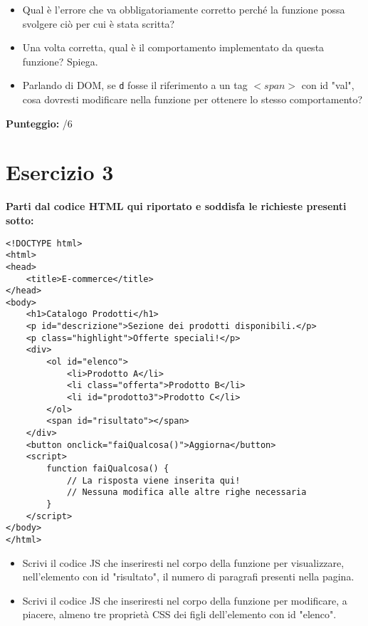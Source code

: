 \documentclass{article}
\begin{document}
\begin{itemize}
    \item Qual è l'errore che va obbligatoriamente corretto perché la funzione possa svolgere ciò per cui è stata scritta?
    \item Una volta corretta, qual è il comportamento implementato da questa funzione? Spiega.
    \item Parlando di DOM, se \texttt{d} fosse il riferimento a un tag $<span>$ con id "val", cosa dovresti modificare nella funzione per ottenere lo stesso comportamento?
\end{itemize}

\begin{flushright}\textbf{Punteggio:} \underline{\hspace{1cm}}/6\end{flushright}

\section*{Esercizio 3}

\textbf{Parti dal codice HTML qui riportato e soddisfa le richieste presenti sotto:}

\begin{lstlisting}
<!DOCTYPE html>
<html>
<head>
    <title>E-commerce</title>
</head>
<body>
    <h1>Catalogo Prodotti</h1>
    <p id="descrizione">Sezione dei prodotti disponibili.</p>
    <p class="highlight">Offerte speciali!</p>
    <div>
        <ol id="elenco">
            <li>Prodotto A</li>
            <li class="offerta">Prodotto B</li>
            <li id="prodotto3">Prodotto C</li>
        </ol>
        <span id="risultato"></span>
    </div>
    <button onclick="faiQualcosa()">Aggiorna</button>
    <script>
        function faiQualcosa() {
            // La risposta viene inserita qui! 
            // Nessuna modifica alle altre righe necessaria
        }
    </script>
</body>
</html>
\end{lstlisting}

\begin{itemize}
    \item Scrivi il codice JS che inseriresti nel corpo della funzione per visualizzare, nell'elemento con id "risultato", il numero di paragrafi presenti nella pagina.
    \item Scrivi il codice JS che inseriresti nel corpo della funzione per modificare, a piacere, almeno tre proprietà CSS dei figli dell'elemento con id "elenco".
\end{itemize}
\end{document}

